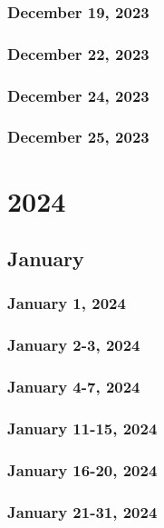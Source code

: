 \section{December 19, 2023}

\section{December 22, 2023}

\section{December 24, 2023}

\section{December 25, 2023}


\part{2024}
\chapter{January}
\section{January 1, 2024}

\section{January 2-3, 2024}

\section{January 4-7, 2024}

\section{January 11-15, 2024}

\section{January 16-20, 2024}

\section{January 21-31, 2024}
